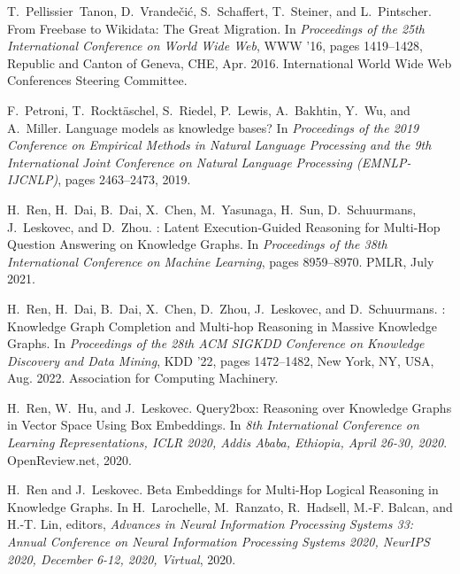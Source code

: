 \documentclass[11pt]{article}
\begin{document}
\begin{thebibliography}{10}
\begin{small}
T.~Pellissier~Tanon, D.~Vrande{\v c}i{\'c}, S.~Schaffert, T.~Steiner, and
L.~Pintscher.
\newblock From {{Freebase}} to {{Wikidata}}: {{The Great Migration}}.
\newblock In {\em Proceedings of the 25th {{International Conference}} on
	{{World Wide Web}}}, {{WWW}} '16, pages 1419--1428, {Republic and Canton of
	Geneva, CHE}, Apr. 2016. {International World Wide Web Conferences Steering
	Committee}.

F.~Petroni, T.~Rockt{\"a}schel, S.~Riedel, P.~Lewis, A.~Bakhtin, Y.~Wu, and
A.~Miller.
\newblock Language models as knowledge bases?
\newblock In {\em Proceedings of the 2019 Conference on Empirical Methods in
	Natural Language Processing and the 9th International Joint Conference on
	Natural Language Processing (EMNLP-IJCNLP)}, pages 2463--2473, 2019.

H.~Ren, H.~Dai, B.~Dai, X.~Chen, M.~Yasunaga, H.~Sun, D.~Schuurmans,
J.~Leskovec, and D.~Zhou.
: {{Latent Execution-Guided Reasoning}} for {{Multi-Hop
		Question Answering}} on {{Knowledge Graphs}}.
\newblock In {\em Proceedings of the 38th {{International Conference}} on
	{{Machine Learning}}}, pages 8959--8970. {PMLR}, July 2021.

H.~Ren, H.~Dai, B.~Dai, X.~Chen, D.~Zhou, J.~Leskovec, and D.~Schuurmans.
: {{Knowledge Graph Completion}} and {{Multi-hop Reasoning}}
in {{Massive Knowledge Graphs}}.
\newblock In {\em Proceedings of the 28th {{ACM SIGKDD Conference}} on
	{{Knowledge Discovery}} and {{Data Mining}}}, {{KDD}} '22, pages 1472--1482,
{New York, NY, USA}, Aug. 2022. {Association for Computing Machinery}.

H.~Ren, W.~Hu, and J.~Leskovec.
\newblock Query2box: {{Reasoning}} over {{Knowledge Graphs}} in {{Vector Space
		Using Box Embeddings}}.
\newblock In {\em 8th {{International Conference}} on {{Learning
			Representations}}, {{ICLR}} 2020, {{Addis Ababa}}, {{Ethiopia}}, {{April}}
	26-30, 2020}. {OpenReview.net}, 2020.

H.~Ren and J.~Leskovec.
\newblock Beta {{Embeddings}} for {{Multi-Hop Logical Reasoning}} in
{{Knowledge Graphs}}.
\newblock In H.~Larochelle, M.~Ranzato, R.~Hadsell, M.-F. Balcan, and H.-T.
Lin, editors, {\em Advances in {{Neural Information Processing Systems}} 33:
	{{Annual Conference}} on {{Neural Information Processing Systems}} 2020,
	{{NeurIPS}} 2020, {{December}} 6-12, 2020, Virtual}, 2020.


\end{small}
\end{thebibliography}
\end{document}
